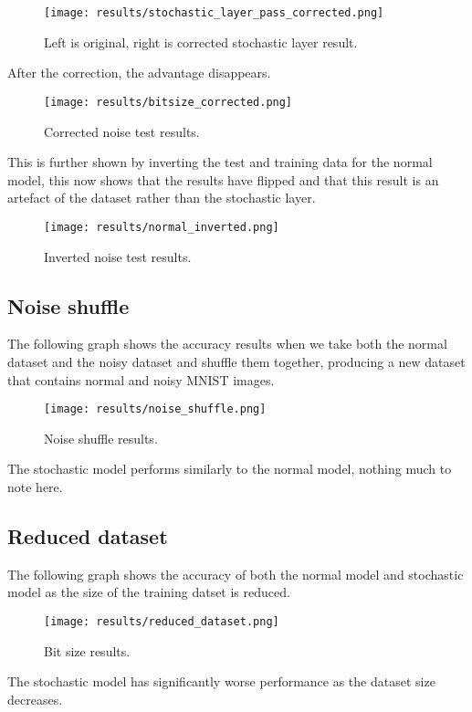 \documentclass[a4paper,oneside,phd,etd]{BYUPhys}
\begin{document}
\begin{figure}[H]
\centering
\texttt{[image: results/stochastic\_layer\_pass\_corrected.png]}
\caption{Left is original, right is corrected stochastic layer result.}
\label{fig:noise_stochastic}
\end{figure}

After the correction, the advantage disappears.
\begin{figure}[H]
\centering
\texttt{[image: results/bitsize\_corrected.png]}
\caption{Corrected noise test results.}
\label{fig:noise_corrected}
\end{figure}

This is further shown by inverting the test and training data for the normal model, this now shows that the results have flipped and that this result is an artefact of the dataset rather than the stochastic layer.
\begin{figure}[H]
\centering
\texttt{[image: results/normal\_inverted.png]}
\caption{Inverted noise test results.}
\label{fig:noise_normal_inverted}
\end{figure}

\vfill
\subsection{Noise shuffle}
The following graph shows the accuracy results when we take both the normal dataset and the noisy dataset and shuffle them together, producing a new dataset that contains normal and noisy MNIST images.
\begin{figure}[H]
\centering
\texttt{[image: results/noise\_shuffle.png]}
\caption{Noise shuffle results.}
\label{fig:noise_shuffle}
\end{figure}
The stochastic model performs similarly to the normal model, nothing much to note here.

\vfill
\subsection{Reduced dataset}
The following graph shows the accuracy of both the normal model and stochastic model as the size of the training datset is reduced.
\begin{figure}[H]
\centering
\texttt{[image: results/reduced\_dataset.png]}
\caption{Bit size results.}
\label{fig:dataset}
\end{figure}
The stochastic model has significantly worse performance as the dataset size decreases.
\end{document}

